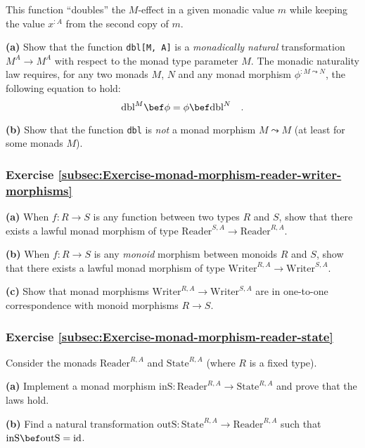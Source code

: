 This function \textsf{``}doubles\textsf{''} the $M$-effect in a given monadic value
$m$ while keeping the value $x^{:A}$ from the second copy of $m$.

\textbf{(a)} Show that the function \lstinline!dbl[M, A]! is a \emph{monadically
natural} transformation $M^{A}\rightarrow M^{A}$ with respect to
the monad type parameter $M$. The monadic naturality law requires,
for any two monads $M$, $N$ and any monad morphism $\phi^{:M\leadsto N}$,
the following equation to hold:
\[
\text{dbl}^{M}\bef\phi=\phi\bef\text{dbl}^{N}\quad.
\]

\textbf{(b)} Show that the function \lstinline!dbl! is \emph{not}
a monad morphism $M\leadsto M$ (at least for some monads $M$).

\subsubsection{Exercise \label{subsec:Exercise-monad-morphism-reader-writer-morphisms}\ref{subsec:Exercise-monad-morphism-reader-writer-morphisms}}

\textbf{(a)} When $f:R\rightarrow S$ is any function between two
types $R$ and $S$, show that there exists a lawful monad morphism
of type $\text{Reader}^{S,A}\rightarrow\text{Reader}^{R,A}$. 

\textbf{(b)} When $f:R\rightarrow S$ is any \emph{monoid} morphism
between monoids $R$ and $S$, show that there exists a lawful monad
morphism of type $\text{Writer}^{R,A}\rightarrow\text{Writer}^{S,A}$.

\textbf{(c)} Show that monad morphisms $\text{Writer}^{R,A}\rightarrow\text{Writer}^{S,A}$
are in one-to-one correspondence with monoid morphisms $R\rightarrow S$.

\subsubsection{Exercise \label{subsec:Exercise-monad-morphism-reader-state}\ref{subsec:Exercise-monad-morphism-reader-state}}

Consider the monads $\text{Reader}^{R,A}$ and $\text{State}^{R,A}$
(where $R$ is a fixed type).

\textbf{(a)} Implement a monad morphism $\text{inS}:\text{Reader}^{R,A}\rightarrow\text{State}^{R,A}$
and prove that the laws hold.

\textbf{(b)} Find a natural transformation $\text{outS}:\text{State}^{R,A}\rightarrow\text{Reader}^{R,A}$
such that $\text{inS}\bef\text{outS}=\text{id}$.

